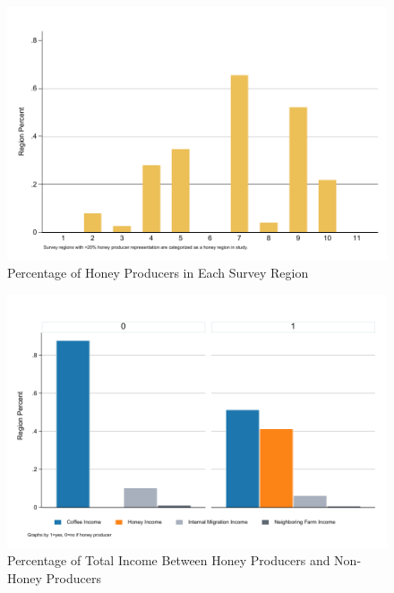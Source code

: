 \documentclass[../main.tex]{subfiles}
\begin{document}
\begin{figure}[h!]
    \centering
    \caption{Percentage of Honey Producers in Each Survey Region}
    \label{fig:graph_honey_regional_percent}    \includegraphics[width=1\textwidth]{project/figures/pdf/graph_honey_regional_percent.pdf}
\end{figure}

\begin{figure}[h!]
    \centering
    \caption{Percentage of Total Income Between Honey Producers and Non-Honey Producers}
    \label{fig:graph_income_sources}    \includegraphics[width=.9\textwidth]{project/figures/pdf/graph_income_sources.pdf}
\end{figure}
\end{document}
